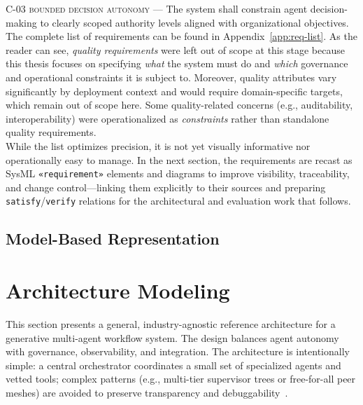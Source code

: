 \noindent \textsc{C-03 bounded decision autonomy} --- The system shall constrain agent decision-making to clearly scoped authority levels aligned with organizational objectives. \\

The complete list of requirements can be found in Appendix~\ref{app:req-list}. As the reader can see, \emph{quality requirements} were left out of scope at this stage because this thesis focuses on specifying \emph{what} the system must do and \emph{which} governance and operational constraints it is subject to. Moreover, quality attributes vary significantly by deployment context and would require domain-specific targets, which remain out of scope here. Some quality-related concerns (e.g., auditability, interoperability) were operationalized as \emph{constraints} rather than standalone quality requirements. \\

While the list optimizes precision, it is not yet visually informative nor operationally easy to manage. In the next section, the requirements are recast as SysML \texttt{«requirement»} elements and diagrams to improve visibility, traceability, and change control—linking them explicitly to their sources and preparing \texttt{satisfy}/\texttt{verify} relations for the architectural and evaluation work that follows.

\subsection{Model-Based Representation}\label{subsec:req-model}


\section{Architecture Modeling}\label{sec:mod-mas}
This section presents a general, industry-agnostic reference architecture for a generative multi-agent workflow system. The design balances agent autonomy with governance, observability, and integration. The architecture is intentionally simple: a central orchestrator coordinates a small set of specialized agents and vetted tools; complex patterns (e.g., multi-tier supervisor trees or free-for-all peer meshes) are avoided to preserve transparency and debuggability~\parencite{langchain_multi_agents, cognition_dont_build}.



